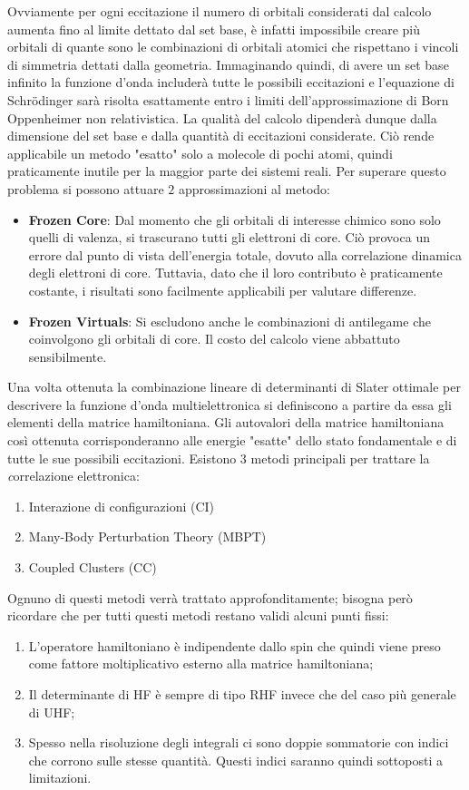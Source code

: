 \documentclass[oneside]{amsbook}
\numberwithin{section}{chapter}
\numberwithin{equation}{section}
\numberwithin{figure}{section}
\begin{document}
Ovviamente per ogni eccitazione  il numero di orbitali considerati dal calcolo aumenta fino al limite dettato dal set base, è infatti impossibile creare più orbitali di quante sono le combinazioni di orbitali atomici che rispettano i vincoli di simmetria dettati dalla geometria.
Immaginando quindi, di avere un set base infinito la funzione d'onda includerà tutte le possibili eccitazioni e l'equazione di Schr\"odinger sarà risolta esattamente entro i limiti dell'approssimazione di Born Oppenheimer non relativistica.
La qualità del calcolo dipenderà dunque dalla dimensione del set base e dalla quantità di eccitazioni considerate. Ciò rende applicabile un metodo "esatto" solo a molecole di pochi atomi, quindi praticamente inutile per la maggior parte dei sistemi reali. Per superare questo problema si possono attuare $2$ approssimazioni al metodo:
\begin{itemize}
\item \textbf{Frozen Core}: Dal momento che gli orbitali di interesse chimico sono solo quelli di valenza, si trascurano tutti gli elettroni di core. Ciò provoca un errore dal punto di vista dell'energia totale, dovuto alla correlazione dinamica degli elettroni di core. Tuttavia, dato che il loro contributo è praticamente costante, i risultati sono facilmente applicabili per valutare differenze. 
\item \textbf{Frozen Virtuals}: Si escludono anche le combinazioni di antilegame che coinvolgono gli orbitali di core. Il costo del calcolo viene abbattuto sensibilmente.
\end{itemize}
Una volta ottenuta la combinazione lineare di determinanti di Slater ottimale per descrivere la funzione d'onda multielettronica si definiscono a partire da essa gli elementi della matrice hamiltoniana. Gli autovalori della matrice hamiltoniana così ottenuta corrisponderanno alle energie "esatte" dello stato fondamentale e di tutte le sue possibili eccitazioni.
Esistono $3$ metodi principali per trattare la \emph correlazione elettronica:
\begin{enumerate}
\item Interazione di configurazioni (CI)
\item Many-Body Perturbation Theory (MBPT)
\item Coupled Clusters (CC)
\end{enumerate}
Ognuno di questi metodi verrà trattato approfonditamente; bisogna però ricordare che per tutti questi metodi restano validi alcuni punti fissi:
\begin{enumerate}
\item L'operatore hamiltoniano è indipendente dallo spin che quindi viene preso come fattore moltiplicativo esterno alla matrice hamiltoniana;
\item Il determinante di HF è sempre di tipo RHF invece che del caso più generale di UHF;
\item Spesso nella risoluzione degli integrali ci sono doppie sommatorie con indici che corrono sulle stesse quantità. Questi indici saranno quindi sottoposti a limitazioni.
\end{enumerate}
\end{document}
